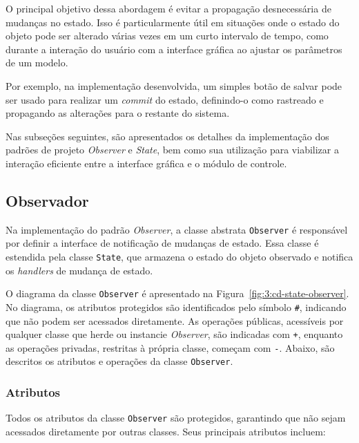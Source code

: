 O principal objetivo dessa abordagem é evitar a propagação desnecessária de mudanças no estado. Isso é particularmente útil em situações onde o estado do objeto pode ser alterado várias vezes em um curto intervalo de tempo, como durante a interação do usuário com a interface gráfica ao ajustar os parâmetros de um modelo.

Por exemplo, na implementação desenvolvida, um simples botão de salvar pode ser usado para realizar um \textit{commit} do estado, definindo-o como rastreado e propagando as alterações para o restante do sistema.

Nas subseções seguintes, são apresentados os detalhes da implementação dos padrões de projeto \textit{Observer} e \textit{State}, bem como sua utilização para viabilizar a interação eficiente entre a interface gráfica e o módulo de controle.

\subsection{Observador}

Na implementação do padrão \textit{Observer}, a classe abstrata \texttt{Observer} é responsável por definir a interface de notificação de mudanças de estado. Essa classe é estendida pela classe \texttt{State}, que armazena o estado do objeto observado e notifica os \textit{handlers} de mudança de estado.

O diagrama da classe \texttt{Observer} é apresentado na Figura~\ref{fig:3:cd-state-observer}. No diagrama, os atributos protegidos são identificados pelo símbolo \texttt{\#}, indicando que não podem ser acessados diretamente. As operações públicas, acessíveis por qualquer classe que herde ou instancie \textit{Observer}, são indicadas com \texttt{+}, enquanto as operações privadas, restritas à própria classe, começam com \texttt{-}. Abaixo, são descritos os atributos e operações da classe \texttt{Observer}.

\subsubsection{Atributos}

Todos os atributos da classe \texttt{Observer} são protegidos, garantindo que não sejam acessados diretamente por outras classes. Seus principais atributos incluem:

